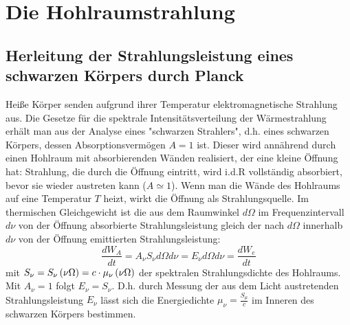 \section{Die Hohlraumstrahlung} %
\label{sec:Die_Hohlraumstrahlung}
\subsection{Herleitung der Strahlungsleistung eines schwarzen Körpers durch
Planck} %
\label{sub:Herleitung_der_Strahlungsleistung_eines_schwarzen_Körpers_durch_Plan}
Heiße Körper senden aufgrund ihrer Temperatur elektromagnetische Strahlung aus.
Die Gesetze für die spektrale Intensitätsverteilung der Wärmestrahlung erhält
man aus der Analyse eines "schwarzen Strahlers", d.h. eines schwarzen Körpers,
dessen Absorptionsvermögen $A=1$ ist. Dieser wird annährend durch einen
Hohlraum mit absorbierenden Wänden realisiert, der eine kleine Öffnung hat:
Strahlung, die durch die Öffnung eintritt, wird i.d.R vollständig absorbiert,
bevor sie wieder austreten kann ($A\simeq1$).
Wenn man die Wände des Hohlraums auf eine Temperatur $T$ heizt, wirkt die
Öffnung als Strahlungsquelle. Im thermischen Gleichgewicht ist die aus dem
Raumwinkel $d\Omega$ im Frequenzintervall $d\nu$ von der Öffnung absorbierte
Strahlungsleistung gleich der nach $d\Omega$ innerhalb $d\nu$ von der Öffnung
emittierten Strahlungsleistung:
\begin{equation*}
    \frac{d W_A}{d t}= A_{\nu} S_{\nu} d\Omega d\nu 
    =
    E_{\nu} d\Omega d\nu = \frac{d W_e}{d t}
\end{equation*}
mit $S_{\nu} = S_{\nu} \left( \nu \Omega \right) = c \cdot \mu_{\nu} \left( \nu \Omega \right) $
der spektralen Strahlungsdichte des Hohlraums. Mit $A_{\nu} =1 $ folgt $E_{\nu}
= S_{\nu}$. D.h. durch Messung der aus dem Licht austretenden Strahlungsleistung
$E_{\nu}$ lässt sich die Energiedichte $\mu_{\nu} = \frac{S_{\mu}}{c}$ im
Inneren des schwarzen Körpers bestimmen. 

